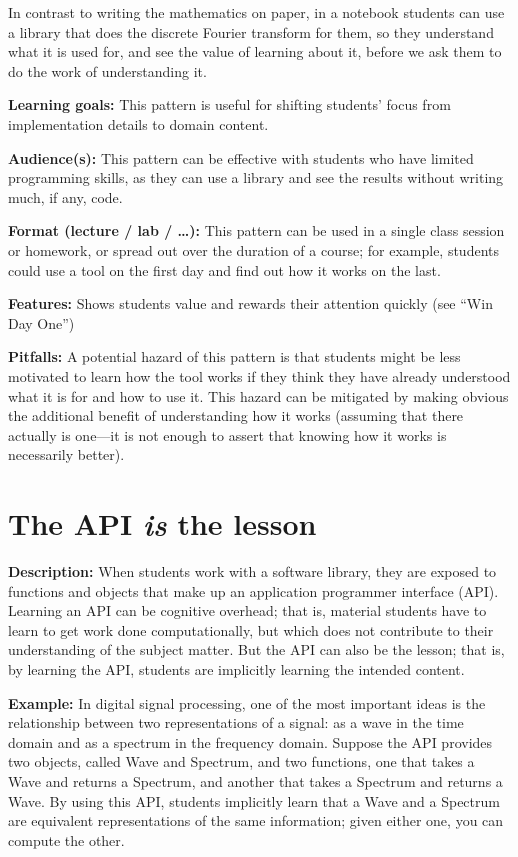 \documentclass[]{book}
\begin{document}
In contrast to writing the mathematics on paper, in a notebook students
can use a library that does the discrete Fourier transform for them, so
they understand what it is used for, and see the value of learning about
it, before we ask them to do the work of understanding it.

\textbf{Learning goals:} This pattern is useful for shifting students'
focus from implementation details to domain content.

\textbf{Audience(s):} This pattern can be effective with students who
have limited programming skills, as they can use a library and see the
results without writing much, if any, code.

\textbf{Format (lecture / lab / \ldots{}):} This pattern can be used in
a single class session or homework, or spread out over the duration of a
course; for example, students could use a tool on the first day and find
out how it works on the last.

\textbf{Features:} Shows students value and rewards their attention
quickly (see ``Win Day One'')

\textbf{Pitfalls:} A potential hazard of this pattern is that students
might be less motivated to learn how the tool works if they think they
have already understood what it is for and how to use it. This hazard
can be mitigated by making obvious the additional benefit of
understanding how it works (assuming that there actually is one---it is
not enough to assert that knowing how it works is necessarily better).

\section{\texorpdfstring{The API \emph{is} the
lesson}{The API is the lesson}}\label{the-api-is-the-lesson}

\textbf{Description:} When students work with a software library, they
are exposed to functions and objects that make up an application
programmer interface (API). Learning an API can be cognitive overhead;
that is, material students have to learn to get work done
computationally, but which does not contribute to their understanding of
the subject matter. But the API can also be the lesson; that is, by
learning the API, students are implicitly learning the intended content.

\textbf{Example:} In digital signal processing, one of the most
important ideas is the relationship between two representations of a
signal: as a wave in the time domain and as a spectrum in the frequency
domain. Suppose the API provides two objects, called Wave and Spectrum,
and two functions, one that takes a Wave and returns a Spectrum, and
another that takes a Spectrum and returns a Wave. By using this API,
students implicitly learn that a Wave and a Spectrum are equivalent
representations of the same information; given either one, you can
compute the other.
\end{document}
